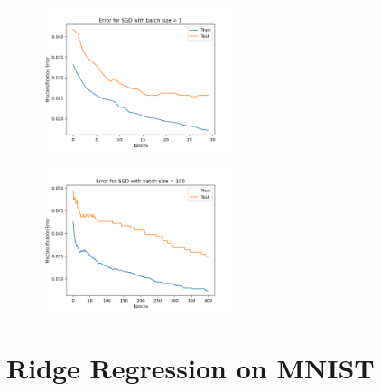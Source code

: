 \documentclass[shortlabels]{article}
\begin{document}
\begin{aprob}
\begin{enumerate}
        \begin{figure}[h]
            \centering \includegraphics[width=0.5\textwidth]{Figure_1d.png}
        \end{figure}
        \begin{figure}[h]
            \centering \includegraphics[width=0.5\textwidth]{Figure_1f.png}
        \end{figure}

    \end{enumerate}

\end{aprob}

\newpage
\section*{Ridge Regression on MNIST}
\end{document}
